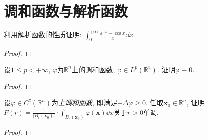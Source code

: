 \section{调和函数与解析函数}
\begin{quiza}
\woe 利用解析函数的性质证明: \(\int_{0}^{+\infty}\frac{\ee^{-x}-\cos x}{x}\dd x\).
\begin{proof}

\end{proof}
\woe 设\(1\leqslant p<+\infty\), \(\varphi\)为\(\mathbb{R}^n\)上的调和函数, \(\varphi\in L^p(\mathbb{R}^n)\). 证明\(\varphi\equiv 0\).
\begin{proof}

\end{proof}
\woe 设\(\varphi\in C^2(\mathbb{R}^n)\)为\textit{上调和函数}, 即满足\(-\Delta\varphi\geqslant 0\). 任取\(\boldsymbol{x}_0\in\mathbb{R}^n\), 证明\(F(r)=\frac{1}{|B_r(\boldsymbol{x}_0)|}\cdot\int_{B_r(\boldsymbol{x}_0)}\varphi(\boldsymbol{x})\dd x\)关于\(r>0\)单调.
\begin{proof}


\end{proof}
\end{quiza}
